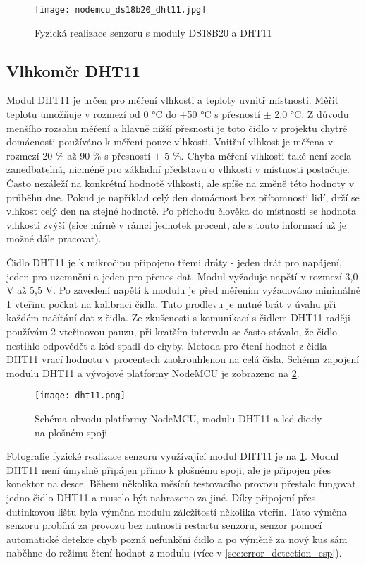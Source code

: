 \begin{figure}[H]
  \centering
  \texttt{[image: nodemcu\_ds18b20\_dht11.jpg]}
  \caption{Fyzická realizace senzoru s moduly DS18B20 a DHT11}
  \label{fig:nodemcu_ds18b20_dht11}
\end{figure} 

\subsection{Vlhkoměr DHT11}

Modul DHT11 je určen pro měření vlhkosti a teploty uvnitř místnosti. Měřit teplotu umožňuje v rozmezí od 0 \si{\degree}C do +50 \si{\degree}C s přesností $\pm$ 2,0 \si{\degree}C. Z důvodu menšího rozsahu měření a hlavně nižší přesnosti je toto čidlo v projektu chytré domácnosti používáno k měření pouze vlhkosti. Vnitřní vlhkost je měřena v rozmezí 20 \% až 90 \% s přesností $\pm$ 5 \%. Chyba měření vlhkosti také není zcela zanedbatelná, nicméně pro základní představu o vlhkosti v místnosti postačuje. Často nezáleží na konkrétní hodnotě vlhkosti, ale spíše na změně této hodnoty v průběhu dne. Pokud je například celý den domácnost bez přítomnosti lidí, drží se vlhkost celý den na stejné hodnotě. Po příchodu člověka do místnosti se hodnota vlhkosti zvýší (sice mírně v rámci jednotek procent, ale s touto informací už je možné dále pracovat). \par
Čidlo DHT11 je k mikročipu připojeno třemi dráty - jeden drát pro napájení, jeden pro uzemnění a jeden pro přenos dat. Modul vyžaduje napětí v rozmezí 3,0 V až 5,5 V. Po zavedení napětí k modulu je před měřením vyžadováno minimálně 1 vteřinu počkat na kalibraci čidla. Tuto prodlevu je nutné brát v úvahu při každém načítání dat z čidla. Ze zkušenosti s komunikací s čidlem DHT11 raději používám 2 vteřinovou pauzu, při kratším intervalu se často stávalo, že čidlo nestihlo odpovědět a kód spadl do chyby. Metoda pro čtení hodnot z čidla DHT11 vrací hodnotu v procentech zaokrouhlenou na celá čísla. Schéma zapojení modulu DHT11 a vývojové platformy NodeMCU je zobrazeno na \cref{fig:schema_esp_dht11}. \par

\begin{figure}[H]
  \centering
  \texttt{[image: dht11.png]}
  \caption{Schéma obvodu platformy NodeMCU, modulu DHT11 a led diody na plošném spoji}
  \label{fig:schema_esp_dht11}
\end{figure}

Fotografie fyzické realizace senzoru využívající modul DHT11 je na \cref{fig:nodemcu_ds18b20_dht11}. Modul DHT11 není úmyslně připájen přímo k plošnému spoji, ale je připojen přes konektor na desce. Během několika měsíců testovacího provozu přestalo fungovat jedno čidlo DHT11 a muselo být nahrazeno za jiné. Díky připojení přes dutinkovou lištu byla výměna modulu záležitostí několika vteřin. Tato výměna senzoru probíhá za provozu bez nutnosti restartu senzoru, senzor pomocí automatické detekce chyb pozná nefunkční čidlo a po výměně za nový kus sám naběhne do režimu čtení hodnot z modulu (více v \cref{sec:error_detection_esp}).

